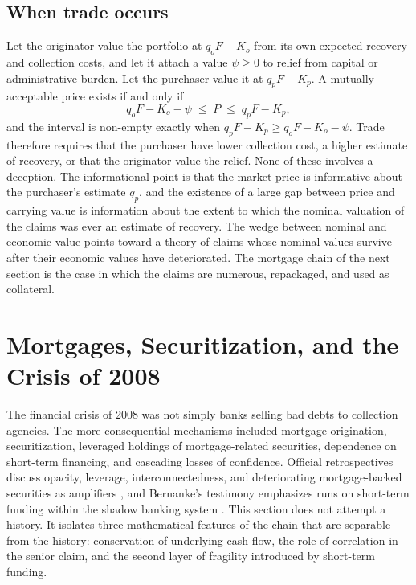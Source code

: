 \documentclass[11pt]{article}
\theoremstyle{definition}
\theoremstyle{remark}
\begin{document}
\subsection{When trade occurs}

Let the originator value the portfolio at $q_oF-K_o$ from its own expected recovery and collection costs, and let it attach a value $\psi\ge 0$ to relief from capital or administrative burden. Let the purchaser value it at $q_pF-K_p$. A mutually acceptable price exists if and only if
\[
q_oF-K_o-\psi\;\le\;P\;\le\;q_pF-K_p,
\]
and the interval is non-empty exactly when $q_pF-K_p\ge q_oF-K_o-\psi$. Trade therefore requires that the purchaser have lower collection cost, a higher estimate of recovery, or that the originator value the relief. None of these involves a deception. The informational point is that the market price is informative about the purchaser's estimate $q_p$, and the existence of a large gap between price and carrying value is information about the extent to which the nominal valuation of the claims was ever an estimate of recovery. The wedge between nominal and economic value points toward a theory of claims whose nominal values survive after their economic values have deteriorated. The mortgage chain of the next section is the case in which the claims are numerous, repackaged, and used as collateral.

\section{Mortgages, Securitization, and the Crisis of 2008}\label{sec:securitization}

The financial crisis of 2008 was not simply banks selling bad debts to collection agencies. The more consequential mechanisms included mortgage origination, securitization, leveraged holdings of mortgage-related securities, dependence on short-term financing, and cascading losses of confidence. Official retrospectives discuss opacity, leverage, interconnectedness, and deteriorating mortgage-backed securities as amplifiers \cite{fdic2017,fcic2011}, and Bernanke's testimony emphasizes runs on short-term funding within the shadow banking system \cite{bernanke2010,gorton2012}. This section does not attempt a history. It isolates three mathematical features of the chain that are separable from the history: conservation of underlying cash flow, the role of correlation in the senior claim, and the second layer of fragility introduced by short-term funding.
\end{document}
